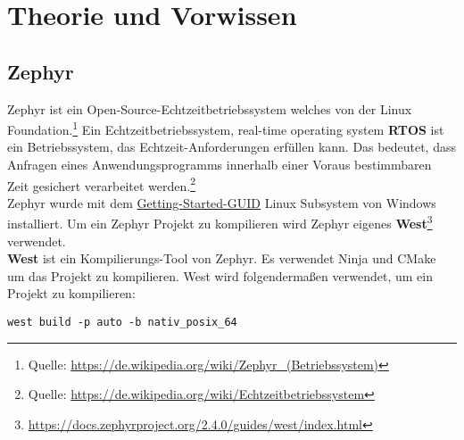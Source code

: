 \newpage
\section{Theorie und Vorwissen}
\subsection{Zephyr}
    Zephyr ist ein Open-Source-Echtzeitbetriebssystem welches von der Linux Foundation.\footnote{Quelle: \url{https://de.wikipedia.org/wiki/Zephyr_(Betriebssystem)}}
    Ein Echtzeitbetriebssystem, real-time operating system \textbf{RTOS} ist ein Betriebssystem, das Echtzeit-Anforderungen erfüllen kann. 
    Das bedeutet, dass Anfragen eines Anwendungsprogramms innerhalb einer Voraus bestimmbaren Zeit gesichert verarbeitet werden.\footnote{Quelle: \url{https://de.wikipedia.org/wiki/Echtzeitbetriebssystem}}
    \\
    Zephyr wurde mit dem \href{https://docs.zephyrproject.org/latest/getting_started/index.html}{Getting-Started-GUID} Linux Subsystem von Windows installiert. 
    Um ein Zephyr Projekt zu kompilieren wird Zephyr eigenes \textbf{West}\footnote{\url{https://docs.zephyrproject.org/2.4.0/guides/west/index.html}} verwendet.\\
    \textbf{West} ist ein Kompilierungs-Tool von Zephyr. Es verwendet Ninja und CMake um das Projekt zu kompilieren. 
    West wird folgendermaßen verwendet, um ein Projekt zu kompilieren: 
    \begin{lstlisting}[style=StyleC, captionpos=b, caption=West Beispiel, label=West Beispiel]
west build -p auto -b nativ_posix_64 
    \end{lstlisting}

